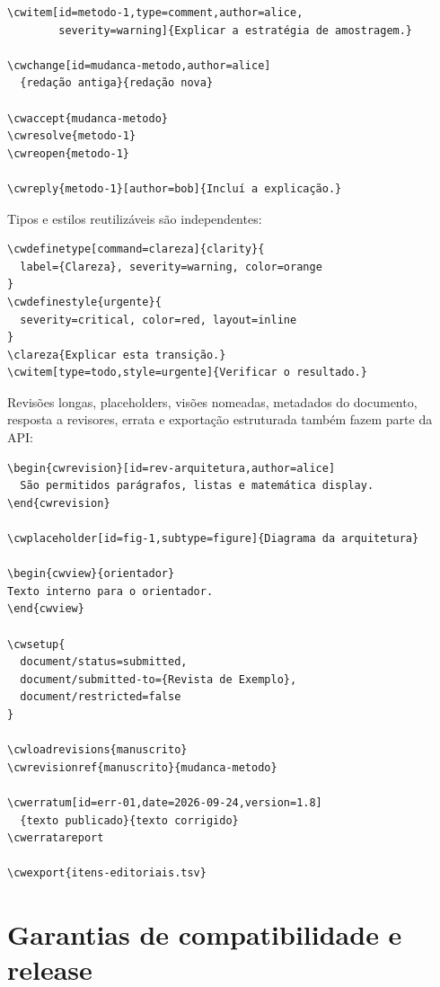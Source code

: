 \documentclass[11pt]{article}
\begin{document}
\begin{verbatim}
\cwitem[id=metodo-1,type=comment,author=alice,
        severity=warning]{Explicar a estratégia de amostragem.}

\cwchange[id=mudanca-metodo,author=alice]
  {redação antiga}{redação nova}

\cwaccept{mudanca-metodo}
\cwresolve{metodo-1}
\cwreopen{metodo-1}

\cwreply{metodo-1}[author=bob]{Incluí a explicação.}
\end{verbatim}

Tipos e estilos reutilizáveis são independentes:

\begin{verbatim}
\cwdefinetype[command=clareza]{clarity}{
  label={Clareza}, severity=warning, color=orange
}
\cwdefinestyle{urgente}{
  severity=critical, color=red, layout=inline
}
\clareza{Explicar esta transição.}
\cwitem[type=todo,style=urgente]{Verificar o resultado.}
\end{verbatim}

Revisões longas, placeholders, visões nomeadas, metadados do documento,
resposta a revisores, errata e exportação estruturada também fazem parte da API:

\begin{verbatim}
\begin{cwrevision}[id=rev-arquitetura,author=alice]
  São permitidos parágrafos, listas e matemática display.
\end{cwrevision}

\cwplaceholder[id=fig-1,subtype=figure]{Diagrama da arquitetura}

\begin{cwview}{orientador}
Texto interno para o orientador.
\end{cwview}

\cwsetup{
  document/status=submitted,
  document/submitted-to={Revista de Exemplo},
  document/restricted=false
}

\cwloadrevisions{manuscrito}
\cwrevisionref{manuscrito}{mudanca-metodo}

\cwerratum[id=err-01,date=2026-09-24,version=1.8]
  {texto publicado}{texto corrigido}
\cwerratareport

\cwexport{itens-editoriais.tsv}
\end{verbatim}

\section*{Garantias de compatibilidade e release}
\end{document}
